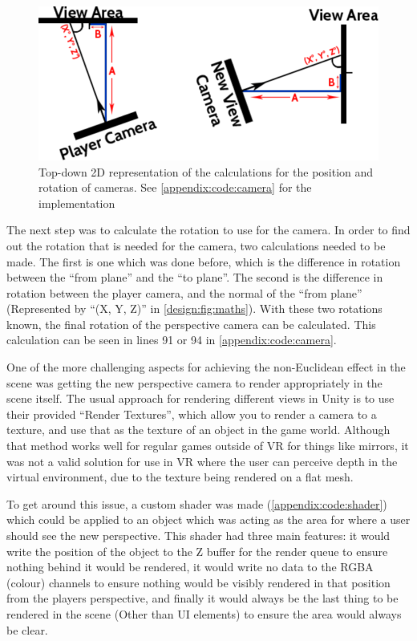 		\begin{figure}[h]
			\includegraphics[width=1\textwidth]{Images/Position}
			\centering
			\caption{Top-down 2D representation of the calculations for the position and rotation of cameras.
				See \autoref{appendix:code:camera} for the implementation}
			\label{design:fig:maths}
		\end{figure}

		The next step was to calculate the rotation to use for the camera.
		In order to find out the rotation that is needed for the camera, two calculations needed to be made.
		The first is one which was done before, which is the difference in rotation between the \enquote{from plane} and the \enquote{to plane}.
		The second is the difference in rotation between the player camera, and the normal of the \enquote{from plane} (Represented by \enquote{(X\degree, Y\degree, Z\degree)} in \autoref{design:fig:maths}).
		With these two rotations known, the final rotation of the perspective camera can be calculated.
		This calculation can be seen in lines 91 or 94 in \autoref{appendix:code:camera}.

		One of the more challenging aspects for achieving the non-Euclidean effect in the scene was getting the new perspective camera to render appropriately in the scene itself.
		The usual approach for rendering different views in Unity is to use their provided \enquote{Render Textures}, which allow you to render a camera to a texture, and use that as the texture of an object in the game world.
		Although that method works well for regular games outside of VR for things like mirrors, it was not a valid solution for use in VR where the user can perceive depth in the virtual environment, due to the texture being rendered on a flat mesh.

		To get around this issue, a custom shader was made (\autoref{appendix:code:shader}) which could be applied to an object which was acting as the area for where a user should see the new perspective.
		This shader had three main features: it would write the position of the object to the Z buffer for the render queue to ensure nothing behind it would be rendered, it would write no data to the RGBA (colour) channels to ensure nothing would be visibly rendered in that position from the players perspective, and finally it would always be the last thing to be rendered in the scene (Other than UI elements) to ensure the area would always be clear.

